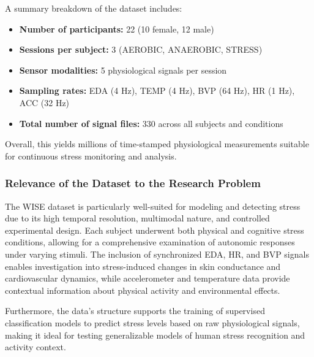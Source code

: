\documentclass[12pt,letterpaper]{article}
\begin{document}
A summary breakdown of the dataset includes:
\begin{itemize}
    \item \textbf{Number of participants:} 22 (10 female, 12 male)
    \item \textbf{Sessions per subject:} 3 (AEROBIC, ANAEROBIC, STRESS)
    \item \textbf{Sensor modalities:} 5 physiological signals per session
    \item \textbf{Sampling rates:} EDA (4 Hz), TEMP (4 Hz), BVP (64 Hz), HR (1 Hz), ACC (32 Hz)
    \item \textbf{Total number of signal files:} 330 across all subjects and conditions
\end{itemize}

\vspace{0.5em}
Overall, this yields millions of time-stamped physiological measurements suitable for continuous stress monitoring and analysis.

\subsubsection{Relevance of the Dataset to the Research Problem}
The WISE dataset is particularly well-suited for modeling and detecting stress due to its high temporal resolution, multimodal nature, and controlled experimental design. Each subject underwent both physical and cognitive stress conditions, allowing for a comprehensive examination of autonomic responses under varying stimuli. The inclusion of synchronized EDA, HR, and BVP signals enables investigation into stress-induced changes in skin conductance and cardiovascular dynamics, while accelerometer and temperature data provide contextual information about physical activity and environmental effects.

Furthermore, the data’s structure supports the training of supervised classification models to predict stress levels based on raw physiological signals, making it ideal for testing generalizable models of human stress recognition and activity context.
\end{document}
